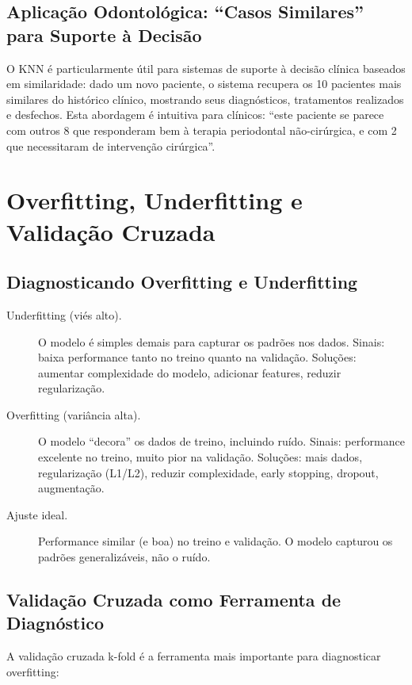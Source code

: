 \subsection{Aplicação Odontológica: ``Casos Similares'' para Suporte à Decisão}

O KNN é particularmente útil para sistemas de suporte à decisão clínica baseados em similaridade: dado um novo paciente, o sistema recupera os 10 pacientes mais similares do histórico clínico, mostrando seus diagnósticos, tratamentos realizados e desfechos. Esta abordagem é intuitiva para clínicos: ``este paciente se parece com outros 8 que responderam bem à terapia periodontal não-cirúrgica, e com 2 que necessitaram de intervenção cirúrgica''.

\section{Overfitting, Underfitting e Validação Cruzada}

\subsection{Diagnosticando Overfitting e Underfitting}

\begin{description}
    \item[Underfitting (viés alto).] O modelo é simples demais para capturar os padrões nos dados. Sinais: baixa performance tanto no treino quanto na validação. Soluções: aumentar complexidade do modelo, adicionar features, reduzir regularização.
    
    \item[Overfitting (variância alta).] O modelo ``decora'' os dados de treino, incluindo ruído. Sinais: performance excelente no treino, muito pior na validação. Soluções: mais dados, regularização (L1/L2), reduzir complexidade, early stopping, dropout, augmentação.
    
    \item[Ajuste ideal.] Performance similar (e boa) no treino e validação. O modelo capturou os padrões generalizáveis, não o ruído.
\end{description}

\subsection{Validação Cruzada como Ferramenta de Diagnóstico}

A validação cruzada k-fold  é a ferramenta mais importante para diagnosticar overfitting:

